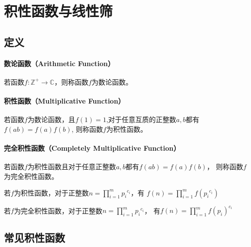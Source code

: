 \section{积性函数与线性筛}
\subsection{定义}
\paragraph{数论函数（Arithmetic Function）}
若函数$f:\mathbb{Z^+}\rightarrow\mathbb{C}$，则称函数$f$为数论函数。

\paragraph{积性函数（Multiplicative Function）}
若函数$f$为数论函数，且$f(1)=1$,对于任意互质的正整数$a,b$都有$f(ab)=f(a)f(b)$,
则称函数$f$为积性函数。

\paragraph{完全积性函数（Completely Multiplicative Function）}
若函数$f$为积性函数且对于任意正整数$a,b$都有$f(ab)=f(a)f(b)$，
则称函数$f$为完全积性函数。
\begin{character}\label{MFC}
	若$f$为积性函数，对于正整数$\displaystyle n=\prod_{i=1}^m{{p_i}^{c_i}}$，有
	$\displaystyle f(n)=\prod_{i=1}^m{f({p_i}^{c_i})}$
\end{character}
\begin{character}
	若$f$为完全积性函数，对于正整数$\displaystyle n=\prod_{i=1}^m{{p_i}^{c_i}}$，
	有$\displaystyle f(n)=\prod_{i=1}^m{f(p_i)^{c_i}}$
\end{character}
\subsection{常见积性函数}

